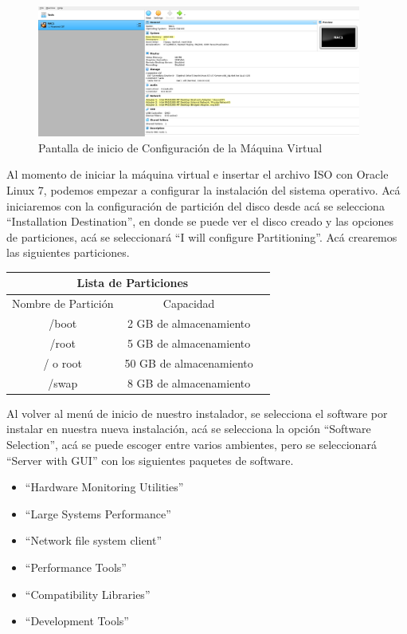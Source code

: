 \documentclass{article}
\begin{document}
\begin{figure}[H]
	\begin{center}
		\includegraphics[width=0.95\textwidth]{vm_base.png}
	\end{center}
	\caption{Pantalla de inicio de Configuración de la Máquina Virtual}
\end{figure}

Al momento de iniciar la máquina virtual e insertar el archivo ISO con Oracle Linux 7, podemos empezar a configurar la instalación del sistema operativo. Acá iniciaremos con la configuración de partición del disco desde acá se selecciona ``Installation Destination'', en donde se puede ver el disco creado y las opciones de particiones, acá se seleccionará ``I will configure Partitioning''. Acá crearemos las siguientes particiones.

\begin{center}
	\begin{tabular}{ |c|c|c| }
		\hline
		\multicolumn{2}{|c|}{Lista de Particiones}    \\
		\hline
		Nombre de Partición & Capacidad               \\
		\hline
		/boot               & 2 GB de almacenamiento  \\
		/root               & 5 GB de almacenamiento  \\
		/ o root            & 50 GB de almacenamiento \\
		/swap               & 8 GB de almacenamiento  \\
		\hline
	\end{tabular}
\end{center}

Al volver al menú de inicio de nuestro instalador, se selecciona el software por instalar en nuestra nueva instalación, acá se selecciona la opción ``Software Selection'', acá se puede escoger entre varios ambientes, pero se seleccionará ``Server with GUI'' con los siguientes paquetes de software.

\begin{itemize}
	\item ``Hardware Monitoring Utilities''
	\item ``Large Systems Performance''
	\item ``Network file system client''
	\item ``Performance Tools''
	\item ``Compatibility Libraries''
	\item ``Development Tools''
\end{itemize}
\end{document}
